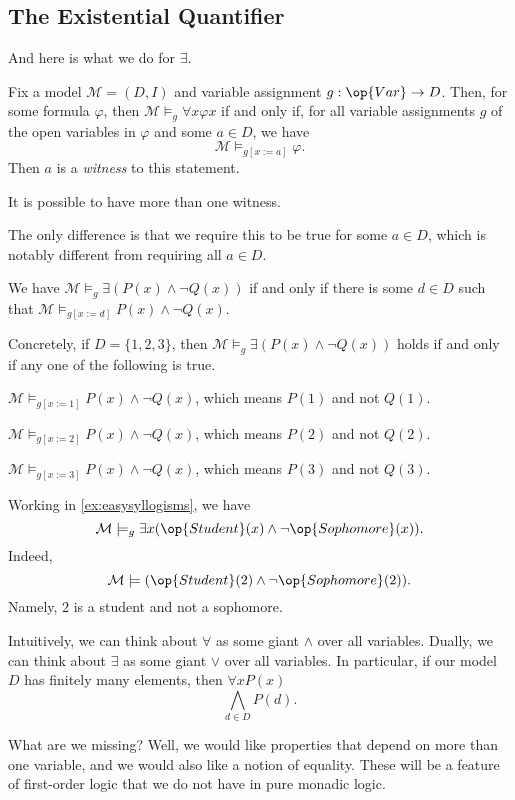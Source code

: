 \documentclass[../notes.tex]{subfiles}
\begin{document}
\subsection{The Existential Quantifier}
And here is what we do for $\exists$.
\begin{definition}
	Fix a model $\mathcal M=(D,I)$ and variable assignment $g:\op{Var}\to D$. Then, for some formula $\varphi$, then $\mathcal M\models_g\forall x\varphi x$ if and only if, for all variable assignments $g$ of the open variables in $\varphi$ and some $a\in D$, we have
	\[\mathcal M\models_{g[x:=a]}\varphi.\]
	Then $a$ is a \textit{witness} to this statement.
\end{definition}
\begin{remark}
	It is possible to have more than one witness.
\end{remark}
The only difference is that we require this to be true for some $a\in D$, which is notably different from requiring all $a\in D$.
\begin{example}
	We have $\mathcal M\models_g\exists(P(x)\land\lnot Q(x))$ if and only if there is some $d\in D$ such that $\mathcal M\models_{g[x:=d]}P(x)\land\lnot Q(x)$.

	Concretely, if $D=\{1,2,3\}$, then $\mathcal M\models_g\exists(P(x)\land\lnot Q(x))$ holds if and only if any one of the following is true.
	\begin{listroman}
		\item $\mathcal M\models_{g[x:=1]}P(x)\land\lnot Q(x)$, which means $P(1)$ and not $Q(1)$.
		\item $\mathcal M\models_{g[x:=2]}P(x)\land\lnot Q(x)$, which means $P(2)$ and not $Q(2)$.
		\item $\mathcal M\models_{g[x:=3]}P(x)\land\lnot Q(x)$, which means $P(3)$ and not $Q(3)$.
	\end{listroman}
\end{example}
\begin{example}
	Working in \autoref{ex:easysyllogisms}, we have
	\[\mathcal M\models_g\exists x(\op{Student}(x)\land\lnot\op{Sophomore}(x)).\]
	Indeed,
	\[\mathcal M\models(\op{Student}(2)\land\lnot\op{Sophomore}(2)).\]
	Namely, $2$ is a student and not a sophomore.
\end{example}
\begin{remark}
	Intuitively, we can think about $\forall$ as some giant $\land$ over all variables. Dually, we can think about $\exists$ as some giant $\lor$ over all variables. In particular, if our model $D$ has finitely many elements, then $\forall xP(x)$
	\[\bigwedge_{d\in D}P(d).\]
\end{remark}
What are we missing? Well, we would like properties that depend on more than one variable, and we would also like a notion of equality. These will be a feature of first-order logic that we do not have in pure monadic logic.
\end{document}
